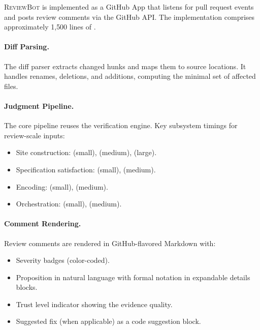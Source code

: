 \documentclass[11pt]{article}
\newcommand{\ReviewBot}{\textsc{ReviewBot}}
\begin{document}
\ReviewBot{} is implemented as a GitHub App that listens for pull request
events and posts review comments via the GitHub API. The implementation
comprises approximately 1{,}500 lines of \Python{}.

\paragraph{Diff Parsing.}
The diff parser extracts changed hunks and maps them to source locations.
It handles renames, deletions, and additions, computing the minimal set of
affected files.

\paragraph{Judgment Pipeline.}
The core pipeline reuses the \JuGeo{} verification engine. Key subsystem
timings for review-scale inputs:
\begin{itemize}[leftmargin=*]
  \item Site construction: \subFormalcoresiteSmallTime{} (small),
        \subFormalcoresiteMediumTime{} (medium),
        \subFormalcoresiteLargeTime{} (large).
  \item Specification satisfaction: \subSpecificationsatisfactionSmallTime{}
        (small), \subSpecificationsatisfactionMediumTime{} (medium).
  \item Encoding: \subEncodeforsolverSmallTime{} (small),
        \subEncodeforsolverMediumTime{} (medium).
  \item Orchestration: \subOrchestrateverificationSmallTime{} (small),
        \subOrchestrateverificationMediumTime{} (medium).
\end{itemize}

\paragraph{Comment Rendering.}
Review comments are rendered in GitHub-flavored Markdown with:
\begin{itemize}[leftmargin=*]
  \item Severity badges (color-coded).
  \item Proposition in natural language with formal notation in expandable
        details blocks.
  \item Trust level indicator showing the evidence quality.
  \item Suggested fix (when applicable) as a code suggestion block.
\end{itemize}
\end{document}
